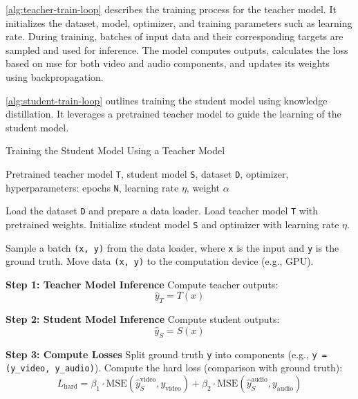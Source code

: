 \autoref{alg:teacher-train-loop} describes the training process for the teacher model. It initializes the dataset, model, optimizer, and training parameters such as learning rate. During training, batches of input data and their corresponding targets are sampled and used for inference. The model computes outputs, calculates the loss based on \gls{mse} for both video and audio components, and updates its weights using backpropagation. 

\autoref{alg:student-train-loop} outlines training the student model using knowledge distillation. It leverages a pretrained teacher model to guide the learning of the student model.
\begin{algorithm}[ht!]
    \caption{Training the Student Model Using a Teacher Model}
    \label{alg:student-train-loop}
    \begin{algorithmic}[1]
        \REQUIRE Pretrained teacher model \texttt{T}, student model \texttt{S}, dataset \texttt{D}, optimizer, hyperparameters: epochs \texttt{N}, learning rate \texttt{$\eta$}, weight \texttt{$\alpha$}
    
        \STATE Load the dataset \texttt{D} and prepare a data loader.
        \STATE Load teacher model \texttt{T} with pretrained weights.
        \STATE Initialize student model \texttt{S} and optimizer with learning rate \texttt{$\eta$}.
    
            \STATE Sample a batch \texttt{(x, y)} from the data loader, where \texttt{x} is the input and \texttt{y} is the ground truth.
            \STATE Move data \texttt{(x, y)} to the computation device (e.g., GPU).
    
            \STATE \textbf{Step 1: Teacher Model Inference}
            \STATE Compute teacher outputs:
            \[
            \hat{y}_T = T(x)
            \]
    
            \STATE \textbf{Step 2: Student Model Inference}
            \STATE Compute student outputs:
            \[
            \hat{y}_S = S(x)
            \]
    
            \STATE \textbf{Step 3: Compute Losses}
            \STATE Split ground truth \texttt{y} into components (e.g., \texttt{y = (y\_video, y\_audio)}).
            \STATE Compute the hard loss (comparison with ground truth):
            \[
            L_\text{hard} = \beta_1 \cdot \text{MSE}(\hat{y}_S^\text{video}, y_\text{video}) + 
                            \beta_2 \cdot \text{MSE}(\hat{y}_S^\text{audio}, y_\text{audio})
            \]


\end{algorithmic}
\end{algorithm}
